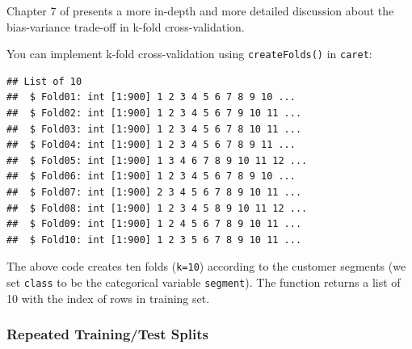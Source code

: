 \documentclass[
  12pt,
]{krantz}
\makeatletter
\newenvironment{Shaded}{\begin{snugshade}}{\end{snugshade}}
\newcommand{\AttributeTok}[1]{\textcolor[rgb]{0.61,0.61,0.61}{#1}}
\newcommand{\CommentTok}[1]{\textcolor[rgb]{0.37,0.37,0.37}{\textit{#1}}}
\newcommand{\DecValTok}[1]{\textcolor[rgb]{0.06,0.06,0.06}{#1}}
\newcommand{\FunctionTok}[1]{\textcolor[rgb]{0,0,0}{#1}}
\newcommand{\NormalTok}[1]{#1}
\newcommand{\OtherTok}[1]{\textcolor[rgb]{0.37,0.37,0.37}{#1}}
\newcommand{\SpecialCharTok}[1]{\textcolor[rgb]{0,0,0}{#1}}
\newenvironment{kframe}{%
\medskip{}
\setlength{\fboxsep}{.8em}
 \def\at@end@of@kframe{}%
 \ifinner\ifhmode%
  \def\at@end@of@kframe{\end{minipage}}%
  \begin{minipage}{\columnwidth}%
 \fi\fi%
 \def\FrameCommand##1{\hskip\@totalleftmargin \hskip-\fboxsep
 \colorbox{shadecolor}{##1}\hskip-\fboxsep
     \hskip-\linewidth \hskip-\@totalleftmargin \hskip\columnwidth}%
 \MakeFramed {\advance\hsize-\width
   \@totalleftmargin\z@ \linewidth\hsize
   \@setminipage}}%
 {\par\unskip\endMakeFramed%
 \at@end@of@kframe}
\renewenvironment{Shaded}{\begin{kframe}}{\end{kframe}}
\makeatother
\begin{document}
Chapter 7 of \citep{Hastie2008} presents a more in-depth and more detailed discussion about the bias-variance trade-off in k-fold cross-validation.

You can implement k-fold cross-validation using \texttt{createFolds()} in \texttt{caret}:

\begin{Shaded}
\end{Shaded}

\begin{verbatim}
## List of 10
##  $ Fold01: int [1:900] 1 2 3 4 5 6 7 8 9 10 ...
##  $ Fold02: int [1:900] 1 2 3 4 5 6 7 9 10 11 ...
##  $ Fold03: int [1:900] 1 2 3 4 5 6 7 8 10 11 ...
##  $ Fold04: int [1:900] 1 2 3 4 5 6 7 8 9 11 ...
##  $ Fold05: int [1:900] 1 3 4 6 7 8 9 10 11 12 ...
##  $ Fold06: int [1:900] 1 2 3 4 5 6 7 8 9 10 ...
##  $ Fold07: int [1:900] 2 3 4 5 6 7 8 9 10 11 ...
##  $ Fold08: int [1:900] 1 2 3 4 5 8 9 10 11 12 ...
##  $ Fold09: int [1:900] 1 2 4 5 6 7 8 9 10 11 ...
##  $ Fold10: int [1:900] 1 2 3 5 6 7 8 9 10 11 ...
\end{verbatim}

The above code creates ten folds (\texttt{k=10}) according to the customer segments (we set \texttt{class} to be the categorical variable \texttt{segment}). The function returns a list of 10 with the index of rows in training set.

\hypertarget{repeated-trainingtest-splits}{%
\subsubsection{Repeated Training/Test Splits}\label{repeated-trainingtest-splits}}
\end{document}
